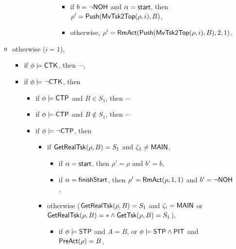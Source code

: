 \begin{itemize}
\begin{itemize}
\begin{itemize}
\begin{itemize}
\begin{itemize}
\begin{itemize}
								\begin{itemize}
									\item if $b = \neg {\sf NOH}$ and $\alpha = {\mathsf{start} }$, then $\rho'=\mathsf{Push}(\mathsf{MvTsk2Top}(\rho, i), B)$,
									\item otherwise, $\rho' = \mathsf{RmAct}(\mathsf{Push}(\mathsf{MvTsk2Top}(\rho, i), B), 2, 1)$, 
								\end{itemize}
							\end{itemize}
                    \end{itemize}
                \end{itemize}
        \end{itemize}
    \item otherwise ($i  = 1$),  
    \begin{itemize}
        \item if $\phi \models {\sf CTK}$, then $\cdots$, 
        \item if $\phi \models \neg {\sf CTK}$, then 
        \begin{itemize}
            \item if $\phi \models {\sf CTP}$ and $B \in S_1$, then $\cdots$
            \item if $\phi \models {\sf CTP}$ and $B\notin S_1$, then $\cdots$
            \item if $\phi \models \neg {\sf CTP}$, then
            \begin{itemize}
				\item if $\mathsf{GetRealTsk}(\rho,B) = S_1$ and $\zeta_1 \neq {\sf MAIN}$, 
				\begin{itemize}
					\item if $\alpha = {\mathsf{start} }$, then $\rho' = \rho$ and $b' = b$,
					\item if $\alpha = {\mathsf{finishStart} }$, then $\rho' = \mathsf{RmAct}(\rho, 1, 1)$ and $b' = \neg{\sf NOH}$,
				\end{itemize}
			\item otherwise ($\mathsf{GetRealTsk}(\rho,B) = S_1$ and $\zeta_i = {\sf MAIN}$ or $\mathsf{GetRealTsk}(\rho,B) = * \wedge\mathsf{GetTsk}(\rho,B) = S_1$), 
			\begin{itemize}
				\item if $\phi\models{\sf STP}$ and $A = B$, or $\phi \models{\sf STP}\wedge{\sf PIT}$ and $\mathsf{PreAct}(\rho) = B$, 

\end{itemize}
\end{itemize}
\end{itemize}
\end{itemize}
\end{itemize}
\end{itemize}
